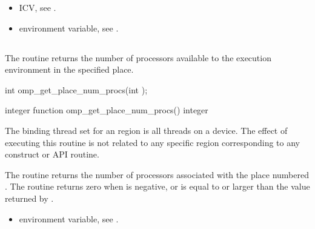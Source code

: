 \crossreferences
\begin{itemize}
\item {} ICV, see 
.

\item {} environment variable, see 
.
\end{itemize}





\subsection{}
\label{subsec:omp_get_place_num_procs}

\summary
The   routine returns the number of processors available to the execution environment in the specified place.

\format
\ccppspecificstart
\begin{boxedcode}
int omp\_get\_place\_num\_procs(int );
\end{boxedcode}
\ccppspecificend

\fortranspecificstart
\begin{boxedcode}
integer function omp\_get\_place\_num\_procs()
integer 
\end{boxedcode}
\fortranspecificend

\binding
The binding thread set for an   region is all threads on a device. The effect of executing this routine is not related to any specific region corresponding to any construct or API routine.

\effect
The  routine returns the number of 
processors associated with the place numbered . The 
routine returns zero when  is negative, or is equal 
to or larger than the value returned by . 

\crossreferences
\begin{itemize}
\item {} environment variable, see 
.
\end{itemize}




\subsection{}
\label{subsec:omp_get_place_proc_ids}

